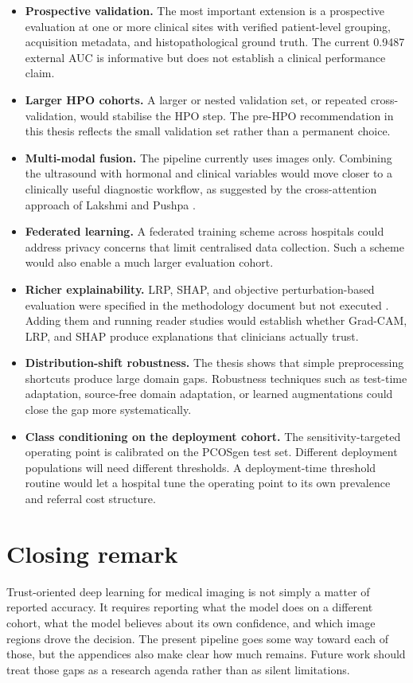 \documentclass[../preamble.tex]{subfiles}
\begin{document}
\begin{itemize}
  \item \textbf{Prospective validation.} The most important extension is a
        prospective evaluation at one or more clinical sites with verified
        patient-level grouping, acquisition metadata, and histopathological
        ground truth. The current 0.9487 external AUC is informative but does
        not establish a clinical performance claim.
  \item \textbf{Larger HPO cohorts.} A larger or nested validation set, or
        repeated cross-validation, would stabilise the HPO step. The
        pre-HPO recommendation in this thesis reflects the small validation
        set rather than a permanent choice.
  \item \textbf{Multi-modal fusion.} The pipeline currently uses images only.
        Combining the ultrasound with hormonal and clinical variables would
        move closer to a clinically useful diagnostic workflow, as suggested
        by the cross-attention approach of Lakshmi and Pushpa
        \cite{lakshmi2026}.
  \item \textbf{Federated learning.} A federated training scheme across
        hospitals could address privacy concerns that limit centralised data
        collection. Such a scheme would also enable a much larger
        evaluation cohort.
  \item \textbf{Richer explainability.} LRP, SHAP, and objective
        perturbation-based evaluation were specified in the methodology
        document but not executed \cite{samek2017,patil2025}. Adding them
        and running reader studies would establish whether Grad-CAM, LRP,
        and SHAP produce explanations that clinicians actually trust.
  \item \textbf{Distribution-shift robustness.} The thesis shows that simple
        preprocessing shortcuts produce large domain gaps. Robustness
        techniques such as test-time adaptation, source-free domain
        adaptation, or learned augmentations could close the gap more
        systematically.
  \item \textbf{Class conditioning on the deployment cohort.} The
        sensitivity-targeted operating point is calibrated on the PCOSgen
        test set. Different deployment populations will need different
        thresholds. A deployment-time threshold routine would let a
        hospital tune the operating point to its own prevalence and referral
        cost structure.
\end{itemize}

\section{Closing remark}
\label{sec:conclusion-closing}

Trust-oriented deep learning for medical imaging is not simply a matter of
reported accuracy. It requires reporting what the model does on a different
cohort, what the model believes about its own confidence, and which image
regions drove the decision. The present pipeline goes some way toward each
of those, but the appendices also make clear how much remains. Future work
should treat those gaps as a research agenda rather than as silent
limitations.
\end{document}
